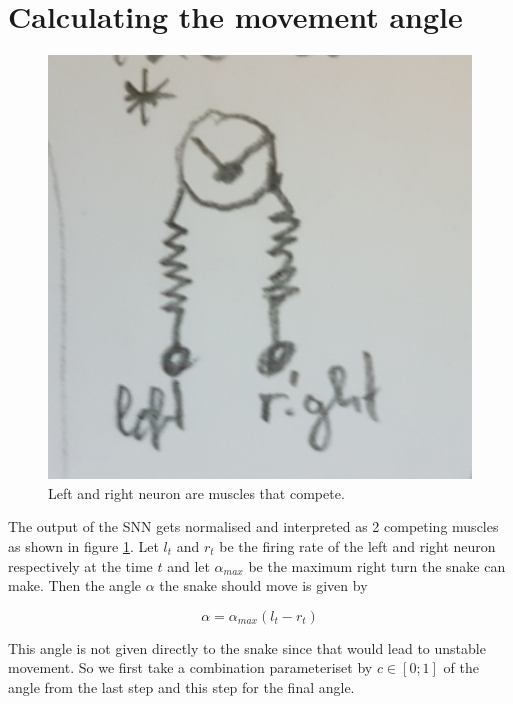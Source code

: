 \section{Calculating the movement angle}

\begin{figure}
	\includegraphics[width=\linewidth]{images/angle_model.jpg}
	\caption{Left and right neuron are muscles that compete.}
	\label{fig:angle_model}
\end{figure}

The output of the SNN gets normalised and interpreted as 2 competing muscles as shown in figure \ref{fig:angle_model}. Let $l_t$ and $r_t$ be the firing rate of the left and right neuron respectively at the time $t$ and let $ \alpha_{max} $ be the maximum right turn the snake can make. Then the angle $\alpha$ the snake should move is given by

\begin{equation}\label{eq:angle}
\alpha = \alpha_{max} \left(l_t - r_t\right)
\end{equation}

This angle is not given directly to the snake since that would lead to unstable movement. So we first take a combination parameteriset by $c \in \left[0; 1\right] $ of the angle from the last step and this step for the final angle.

